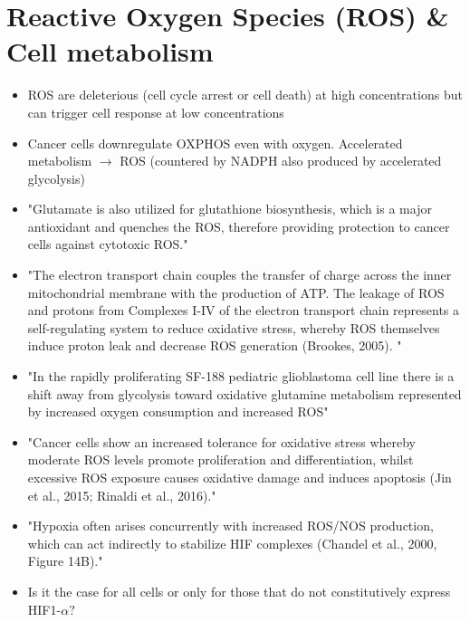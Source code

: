 \documentclass[11pt,a4paper]{article}
\begin{document}
\section{Reactive Oxygen Species (ROS) \& Cell metabolism}
\begin{itemize}
\item ROS are deleterious (cell cycle arrest or cell death) at high concentrations but can trigger cell response at low concentrations \cite{Arfin2021}
\item Cancer cells downregulate OXPHOS even with oxygen. Accelerated metabolism $\rightarrow$ ROS (countered by NADPH also produced by accelerated glycolysis)\cite{Arfin2021}
\item "Glutamate is also utilized for glutathione biosynthesis, which is a major antioxidant and quenches the ROS, therefore providing protection to cancer cells against cytotoxic ROS."\cite{Mudassar2020}
\item "The electron transport chain couples the transfer of charge across the inner mitochondrial membrane with the production of ATP. The leakage of ROS and protons from Complexes I-IV of the electron transport chain represents a self-regulating system to reduce oxidative stress, whereby ROS themselves induce proton leak and decrease ROS generation (Brookes, 2005). "\cite{Strickland2017}
\item "In the rapidly proliferating SF-188 pediatric glioblastoma cell line there is a shift away from glycolysis toward oxidative glutamine metabolism represented by increased oxygen consumption and increased ROS"\cite{Strickland2017}
\item "Cancer cells show an increased tolerance for oxidative stress whereby moderate ROS levels promote proliferation and differentiation, whilst excessive ROS exposure causes oxidative damage and induces apoptosis (Jin et al., 2015; Rinaldi et al., 2016)."\cite{Strickland2017} 
\item "Hypoxia often arises concurrently with increased ROS/NOS production, which can act indirectly to stabilize HIF complexes (Chandel et al., 2000, Figure 14B)."\cite{Strickland2017} 
\item Is it the case for all cells or only for those that do not constitutively express HIF1-$\alpha ?$
\end{itemize}
\end{document}
